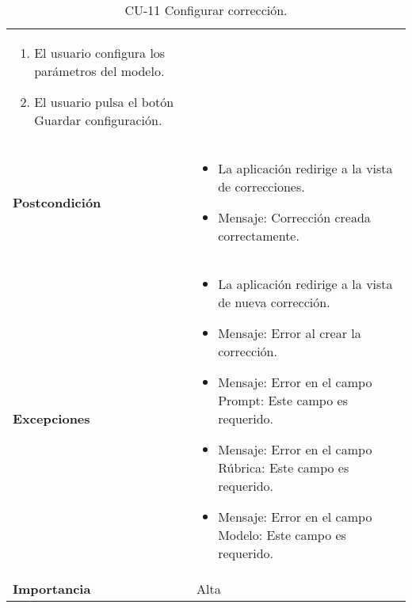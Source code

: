 \begin{table}[p]
\begin{tabularx}{\linewidth}{ p{} p{} }
\begin{enumerate}
                                        \item El usuario configura los parámetros del modelo.
                                        \item El usuario pulsa el botón Guardar configuración.
                            		\end{enumerate} \\
		\textbf{Postcondición}        & \begin{itemize}
                                        \tightlist
		                                  \item La aplicación redirige a la vista de correcciones.
		                                  \item Mensaje: Corrección creada correctamente.
		                                 \end{itemize} \\
		\textbf{Excepciones}         & \begin{itemize}
                                        \tightlist
		                                  \item La aplicación redirige a la vista de nueva corrección.
		                                  \item Mensaje: Error al crear la corrección.
		                                  \item Mensaje: Error en el campo Prompt: Este campo es requerido.
		                                  \item Mensaje: Error en el campo Rúbrica: Este campo es requerido.
		                                  \item Mensaje: Error en el campo Modelo: Este campo es requerido.
		                                 \end{itemize} \\
		\textbf{Importancia}          & Alta \\
		\bottomrule
	\end{tabularx}
	\caption{CU-11 Configurar corrección.}
	\label{tab:CU-11}
\end{table}

